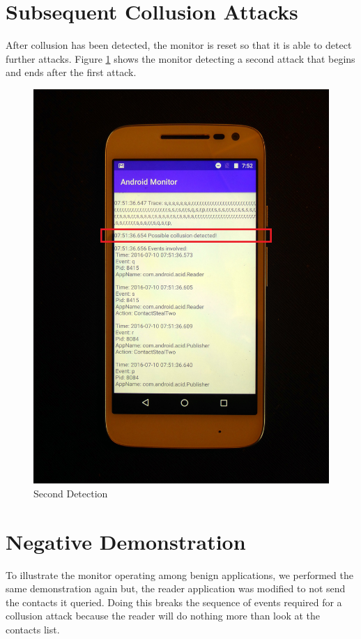 \newpage

\section{Subsequent Collusion Attacks}

After collusion has been detected, the monitor is reset so that it is able to detect further attacks.  Figure \ref{fig:SecondDetection} shows the monitor detecting a second attack that begins and ends after the first attack.

\begin{figure}[h!]
   \centering
   \includegraphics[width=0.7\linewidth]{graphics/PhonePhotos/10 - SecondDetection.jpg}
   \caption{Second Detection}
   \label{fig:SecondDetection}
\end{figure}

\newpage

\section{Negative Demonstration}

To illustrate the monitor operating among benign applications, we performed the same demonstration again but, the reader application was modified to not send the contacts it queried.  Doing this breaks the sequence of events required for a collusion attack because the reader will do nothing more than look at the contacts list.

